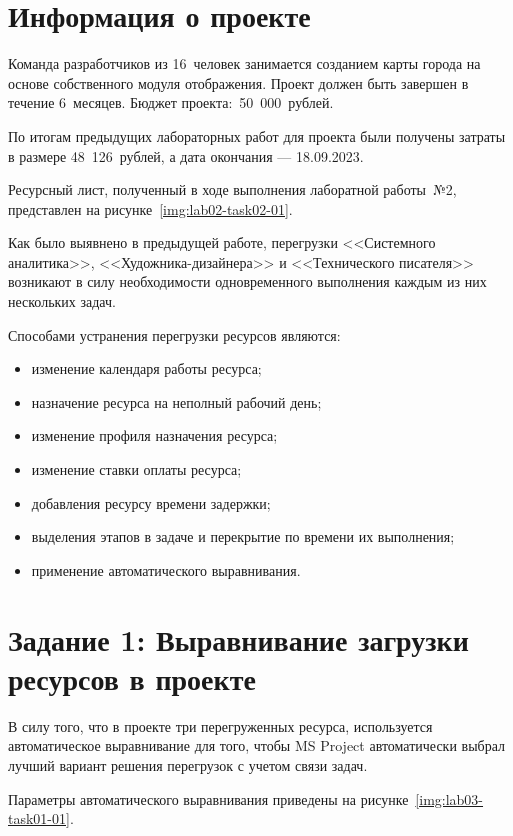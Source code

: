 \section{Информация о проекте}

Команда разработчиков из 16~человек занимается созданием карты города на основе
собственного модуля отображения. Проект должен быть завершен в течение
6~месяцев. Бюджет проекта:~50~000~рублей.

По итогам предыдущих лабораторных работ для проекта были получены затраты в
размере 48~126~рублей, а дата окончания --- 18.09.2023.

Ресурсный лист, полученный в ходе выполнения лаборатной работы~№2, представлен
на рисунке~\ref{img:lab02-task02-01}.


Как было выявнено в предыдущей работе, перегрузки <<Системного аналитика>>,
<<Художника-дизайнера>> и <<Технического писателя>> возникают в силу
необходимости одновременного выполнения каждым из них нескольких задач.

Способами устранения перегрузки ресурсов являются:
\begin{itemize}
    \item изменение календаря работы ресурса;
    \item назначение ресурса на неполный рабочий день;
    \item изменение профиля назначения ресурса;
    \item изменение ставки оплаты ресурса;
    \item добавления ресурсу времени задержки;
    \item выделения этапов в задаче и перекрытие по времени их выполнения;
    \item применение автоматического выравнивания.
\end{itemize}

\section{Задание 1: Выравнивание загрузки ресурсов в проекте}

В силу того, что в проекте три перегруженных ресурса, используется
автоматическое выравнивание для того, чтобы MS Project автоматически выбрал
лучший вариант решения перегрузок с учетом связи задач.

Параметры автоматического выравнивания приведены на
рисунке~\ref{img:lab03-task01-01}.

